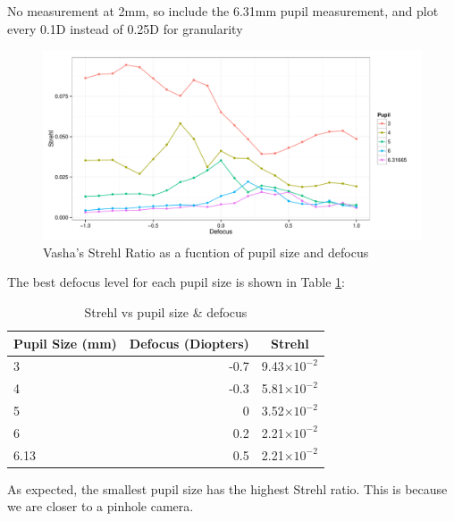 \documentclass{article}
\begin{document}
No measurement at 2mm, so include the 6.31mm pupil measurement, and plot every 0.1D instead of 0.25D for granularity\

\begin{figure}[H]
  \centering
    \includegraphics[width=1\linewidth]{vashapupilsize.pdf}
  \caption{Vasha's Strehl Ratio as a fucntion of pupil size and defocus}
  \label{fig:amtfs}
\end{figure}

The best defocus level for each pupil size is shown in Table \ref{tab:Max Strehl for Vasha's pupil size and defocus}:

\begin{table}[htbp]
    \centering
    \begin{tabular}{lrc}\hline
        Pupil Size (mm) & Defocus (Diopters) & Strehl \\ \hline
        3 & -0.7 & 9.43$\times10^{-2}$ \\
        4 & -0.3 & 5.81$\times10^{-2}$ \\
        5 & 0 & 3.52$\times10^{-2}$ \\
        6 & 0.2 & 2.21$\times10^{-2}$ \\
        6.13 & 0.5 & 2.21$\times10^{-2}$ \\
    \end{tabular}
    \caption{Strehl vs pupil size \& defocus}
    \label{tab:Max Strehl for Vasha's pupil size and defocus}
\end{table}

As expected, the smallest pupil size has the highest Strehl ratio. This is because we are closer to a pinhole camera.
\end{document}
